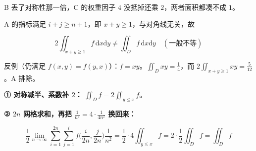 \documentclass[10pt,a4paper]{ctexart}
\begin{document}
B 丢了对称性那一倍，C 的权重因子 $4$ 没抵掉还乘 $2$，两者面积都凑不成 $1$。


A 的指标满足 $i+j\ge n+1$，即 $x+y\ge 1$，与对角线无关，故

\[
2\iint_{x+y\ge1}f\,\mathrm dx\mathrm dy\ne\iint_D f\,\mathrm dx\mathrm dy\quad(\text{一般不等})
\]

反例（仍满足 $f(x,y)=f(y,x)$）：$f=xy$。$\iint_D xy=\frac14$，而 $2\iint_{x+y\ge1}xy=\frac{5}{12}$。A 排除。


\textbf{① 对称减半、系数补 $2$：} $\iint_D f=2\iint_{y\le x}f$。

\textbf{② $2n$ 网格求和，再把 $\frac{1}{n^2}=4\cdot\frac{1}{4n^2}$ 换回来：}

\[
\frac12\lim_{n\to\infty}\sum_{i=1}^{2n}\sum_{j=1}^{i}f\Big(\frac{i}{2n},\frac{j}{2n}\Big)\frac{1}{n^2}=\frac12\cdot 4\iint_{y\le x}f=2\cdot\frac12\iint_D f=\iint_D f
\]





\end{document}
